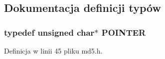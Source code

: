 \subsection{Dokumentacja definicji typów}
\hypertarget{a00010_73204e40637f83518fb695362ea084a4}{
\subsubsection[{POINTER}]{\setlength{\rightskip}{0pt plus 5cm}typedef unsigned char$\ast$ {\bf POINTER}}}
\label{d7/dec/a00010_73204e40637f83518fb695362ea084a4}




Definicja w linii 45 pliku md5.h.